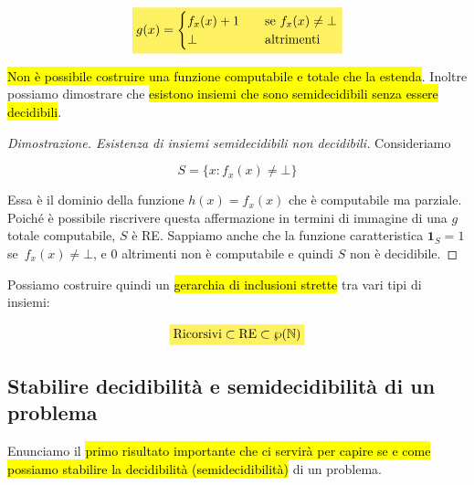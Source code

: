 \documentclass[a4paper,11pt,oneside]{article}
\theoremstyle{plain}
\theoremstyle{definition}
\theoremstyle{remark}
\newcommand{\mhl}[1]{\colorbox{hlcolor}{$\displaystyle #1$}}
\begin{document}
\begin{equation}
  \mhl{
    g(x) =
    \begin{cases}
      f_x(x) + 1 & \quad \text{se } f_x(x) \neq \bot \\
      \bot       & \quad \text{altrimenti}
    \end{cases}
  }
\end{equation}

\hl{Non è possibile costruire una funzione computabile e totale che la estenda}.
Inoltre possiamo dimostrare che \hl{esistono insiemi che sono semidecidibili
senza essere decidibili}.

\begin{proof}[Dimostrazione. Esistenza di insiemi semidecidibili non decidibili]
  Consideriamo

  \[
    S = \{ x : f_x(x) \neq \bot \}
  \]

  Essa è il dominio della funzione $h(x) = f_x(x)$ che è computabile ma
  parziale. Poiché è possibile riscrivere questa affermazione in termini di
  immagine di una $g$ totale computabile, $S$ è RE\@. Sappiamo anche che la
  funzione caratteristica $\mathbf{1}_S = 1$ se $f_x(x) \neq \bot$, e 0
  altrimenti non è computabile e quindi $S$ non è decidibile.
\end{proof}

Possiamo costruire quindi un \hl{gerarchia di inclusioni strette} tra vari tipi di
insiemi:

\begin{equation}
  \mhl{
    \text{Ricorsivi} \subset \text{RE} \subset \wp(\mathbb{N})
  }
\end{equation}

\subsection{Stabilire decidibilità e semidecidibilità di un problema}\label{sec:stabilire-dec-sec-}

Enunciamo il \hl{primo risultato importante che ci servirà per capire se e come
possiamo stabilire la decidibilità (semidecidibilità)} di un problema.
\end{document}
